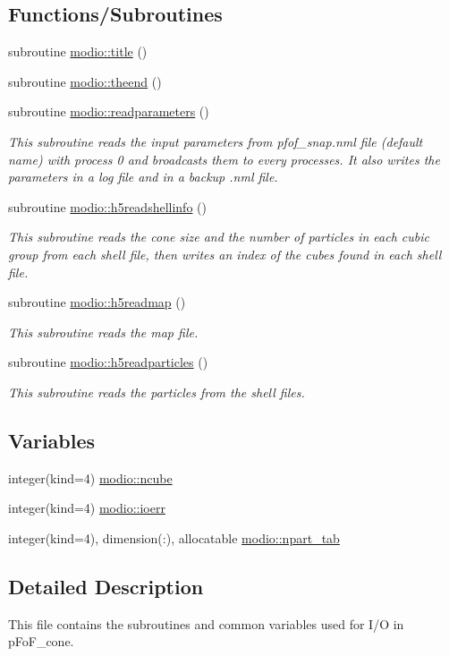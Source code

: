 \subsection*{Functions/\+Subroutines}
\begin{DoxyCompactItemize}
\item 
subroutine \hyperlink{namespacemodio_aefab9476e94da81a75351dbeee74e623}{modio\+::title} ()
\item 
subroutine \hyperlink{namespacemodio_a2688770b2d08498c14ef3212e61d74bf}{modio\+::theend} ()
\item 
subroutine \hyperlink{namespacemodio_aa5e6b5f45cf8cfc091e8e7ff25a97c68}{modio\+::readparameters} ()
\begin{DoxyCompactList}\small\item\em This subroutine reads the input parameters from pfof\+\_\+snap.\+nml file (default name) with process 0 and broadcasts them to every processes. It also writes the parameters in a log file and in a backup .nml file. \end{DoxyCompactList}\item 
subroutine \hyperlink{namespacemodio_a5f1cc94eaee9d1f4f7bdca4cb63ee5bc}{modio\+::h5readshellinfo} ()
\begin{DoxyCompactList}\small\item\em This subroutine reads the cone size and the number of particles in each cubic group from each shell file, then writes an index of the cubes found in each shell file. \end{DoxyCompactList}\item 
subroutine \hyperlink{namespacemodio_a0d3522f20c353a57b002c3120bc266f2}{modio\+::h5readmap} ()
\begin{DoxyCompactList}\small\item\em This subroutine reads the map file. \end{DoxyCompactList}\item 
subroutine \hyperlink{namespacemodio_a8f70f66bd5285c807b17e0c89a6e0e4a}{modio\+::h5readparticles} ()
\begin{DoxyCompactList}\small\item\em This subroutine reads the particles from the shell files. \end{DoxyCompactList}\end{DoxyCompactItemize}
\subsection*{Variables}
\begin{DoxyCompactItemize}
\item 
integer(kind=4) \hyperlink{namespacemodio_af7ac0e60c49f16bf08605237dd728508}{modio\+::ncube}
\item 
integer(kind=4) \hyperlink{namespacemodio_aea2235cb150c2f86e8564ce3d2e606a1}{modio\+::ioerr}
\item 
integer(kind=4), dimension(\+:), allocatable \hyperlink{namespacemodio_a0bb05c9005df17b314c2a7e0f43e758c}{modio\+::npart\+\_\+tab}
\end{DoxyCompactItemize}


\subsection{Detailed Description}
This file contains the subroutines and common variables used for I/O in p\+Fo\+F\+\_\+cone. 

